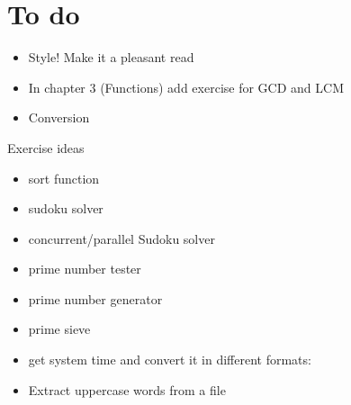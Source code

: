 \section{To do}

\begin{itemize}
\item
Style! Make it a pleasant read
\item
In chapter 3 (Functions) add exercise for GCD and LCM
\item
Conversion 
\end{itemize}
Exercise ideas
\begin{itemize}
\item
sort function
\item
sudoku solver
\item
concurrent/parallel Sudoku solver
\item
prime number tester
\item
prime number generator
\item
prime sieve
\item
get system time and convert it in different formats:
\item
Extract uppercase words from a file
\end{itemize}
